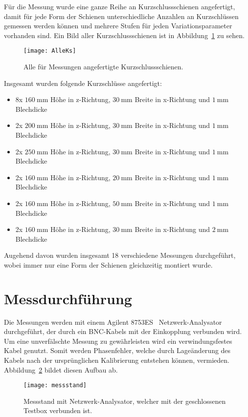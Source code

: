 F\"ur die Messung wurde eine ganze Reihe an Kurzschlussschienen angefertigt, damit f\"ur jede Form der Schienen unterschiedliche Anzahlen an Kurzschl\"ussen gemessen werden k\"onnen und mehrere Stufen f\"ur jeden Variationsparameter vorhanden sind. Ein Bild aller Kurzschlussschienen ist in Abbildung~\ref{fig:AlleKs} zu sehen.
\par
\begin{figure}[htb]
	\centering
	\texttt{[image: AlleKs]}
	\caption{Alle f\"ur Messungen angefertigte Kurzschlussschienen.}
	\label{fig:AlleKs}
\end{figure}
Insgesamt wurden folgende Kurzschl\"usse angefertigt:
\par
\begin{itemize}
	\item 8x $\SI{160}{\milli\meter}$ H\"ohe in z-Richtung, $\SI{30}{\milli\meter}$ Breite in x-Richtung und $\SI{1}{\milli\meter}$ Blechdicke
	\item 2x $\SI{200}{\milli\meter}$ H\"ohe in z-Richtung, $\SI{30}{\milli\meter}$ Breite in x-Richtung und $\SI{1}{\milli\meter}$ Blechdicke
	\item 2x $\SI{250}{\milli\meter}$ H\"ohe in z-Richtung, $\SI{30}{\milli\meter}$ Breite in x-Richtung und $\SI{1}{\milli\meter}$ Blechdicke
	\item 2x $\SI{160}{\milli\meter}$ H\"ohe in z-Richtung, $\SI{20}{\milli\meter}$ Breite in x-Richtung und $\SI{1}{\milli\meter}$ Blechdicke
	\item 2x $\SI{160}{\milli\meter}$ H\"ohe in z-Richtung, $\SI{50}{\milli\meter}$ Breite in x-Richtung und $\SI{1}{\milli\meter}$ Blechdicke
	\item 2x $\SI{160}{\milli\meter}$ H\"ohe in z-Richtung, $\SI{30}{\milli\meter}$ Breite in x-Richtung und $\SI{2}{\milli\meter}$ Blechdicke
\end{itemize}
Augehend davon wurden insgesamt 18 verschiedene Messungen durchgef\"uhrt, wobei immer nur eine Form der Schienen gleichzeitig montiert wurde.


\newpage



\section{Messdurchf\"uhrung}
Die Messungen werden mit einem Agilent 8753ES~\citep{agilent2000} Netzwerk-Analysator durchgef\"uhrt, der durch ein BNC-Kabels mit der Einkopplung verbunden wird. Um eine unverf\"alschte Messung zu gew\"ahrleisten wird ein verwindungsfestes Kabel genutzt. Somit werden Phasenfehler, welche durch Lage\"anderung des Kabels nach der urspr\"unglichen Kalibrierung entstehen k\"onnen, vermieden. Abbildung~\ref{fig:messstand} bildet diesen Aufbau ab.
\par
\begin{figure}[htb]
	\centering
	\texttt{[image: messstand]}
	\caption{Messstand mit Netzwerk-Analysator, welcher mit der geschlossenen Testbox verbunden ist.}
	\label{fig:messstand}
\end{figure}

